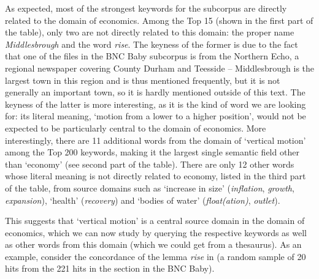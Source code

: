 As expected, most of the strongest keywords  for the subcorpus are directly related to the domain of economics. Among the Top 15 (shown in the first part of the table), only two are not directly related to this domain: the proper name \textit{Middlesbrough} and the word \textit{rise}. The keyness  of the former is due to the fact that one of the files in the BNC Baby   subcorpus is from the Northern Echo, a regional newspaper  covering County Durham and Teesside -- Middlesbrough is the largest town in this region and is thus mentioned frequently, but it is not generally an important town, so it is hardly mentioned outside of this text. The keyness  of the latter is more interesting, as it is the kind of word we are looking for: its literal  meaning,  `motion from a lower to a higher position', would not be expected to be particularly central to the domain of economics. More interestingly, there are 11 additional words from the domain of `vertical motion' among the Top 200 keywords,  making it the largest single semantic field other than `economy' (see second part of the table). There are only 12 other words whose literal meaning  is not directly related to economy, listed in the third part of the table, from source domains such as `increase in size' (\textit{inflation}, \textit{growth}, \textit{expansion}), `health' (\textit{recovery}) and `bodies of water' (\textit{float(ation)}, \textit{outlet}).

This suggests that `vertical motion' is a central source domain in the domain of economics, which we can now study by querying the respective keywords  as well as other words from this domain (which we could get from a thesaurus). As an example, consider the concordance  of the lemma  \textit{rise} in  (a random sample of 20 hits from the 221 hits in the  section in the BNC  Baby).

